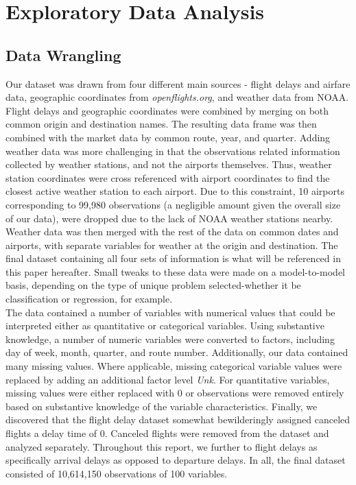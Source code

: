 \documentclass[12pt, a4paper, openany]{book}
\newcommand\tab[1][1cm]{\hspace*{#1}}
\begin{document}
\chapter{Exploratory Data Analysis}
	\section{Data Wrangling}
	\tab Our dataset was drawn from four different main sources - flight delays and airfare data, geographic coordinates from \textit{openflights.org}, and weather data from NOAA. Flight delays and geographic coordinates were combined by merging on both common origin and destination names. The resulting data frame was then combined with the market data by common route, year, and quarter. Adding weather data was more challenging in that the observations related information collected by weather stations, and not the airports themselves. Thus, weather station coordinates were cross referenced with airport coordinates to find the closest active weather station to each airport. Due to this constraint, 10 airports corresponding to 99,980 observations (a negligible amount given the overall size of our data), were dropped due to the lack of NOAA weather stations nearby. Weather data was then merged with the rest of the data on common dates and airports, with separate variables for weather at the origin and destination. The final dataset containing all four sets of information is what will be referenced in this paper hereafter. Small tweaks to these data were made on a model-to-model basis, depending on the type of unique problem selected-whether it be classification or regression, for example. \\
	\tab The data contained a number of variables with numerical values that could be interpreted either as quantitative or categorical variables. Using substantive knowledge, a number of numeric variables were converted to factors, including day of week, month, quarter, and route number. Additionally, our data contained many missing values. Where applicable, missing categorical variable values were replaced by adding an additional factor level \textit{Unk}. For quantitative variables, missing values were either replaced with 0 or observations were removed entirely based on substantive knowledge of the variable characteristics. Finally, we discovered that the flight delay dataset somewhat bewilderingly assigned canceled flights a delay time of 0. Canceled flights were removed from the dataset and analyzed separately. Throughout this report, we further to flight delays as specifically arrival delays as opposed to departure delays. In all, the final dataset consisted of 10,614,150 observations of 100 variables. 
\end{document}
